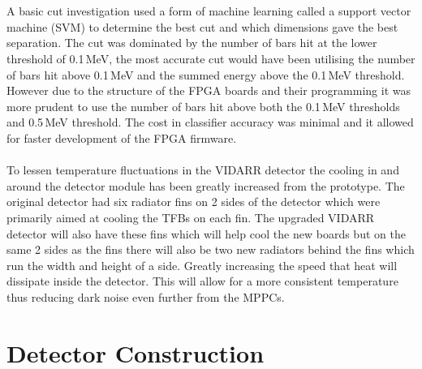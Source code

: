 \\\\A basic cut investigation used a form of machine learning called a support vector machine (SVM) to determine the best cut and which dimensions gave the best separation. The cut was dominated by the number of bars hit at the lower threshold of 0.1\,MeV, the most accurate cut would have been utilising the number of bars hit above 0.1\,MeV and the summed energy above the 0.1\,MeV threshold. However due to the structure of the FPGA boards and their programming it was more prudent to use the number of bars hit above both the 0.1\,MeV thresholds and 0.5\,MeV threshold. The cost in classifier accuracy was minimal and it allowed for faster development of the FPGA firmware. 
\\\\To lessen temperature fluctuations in the VIDARR detector the cooling in and around the detector module has been greatly increased from the prototype. The original detector had six radiator fins on 2 sides of the detector which were primarily aimed at cooling the TFBs on each fin. The upgraded VIDARR detector will also have these fins which will help cool the new boards but on the same 2 sides as the fins there will also be two new radiators behind the fins which run the width and height of a side. Greatly increasing the speed that heat will dissipate inside the detector. This will allow for a more consistent temperature  thus reducing dark noise even further from the MPPCs. 

\section{Detector Construction}\label{sec:DetectorConstruction}




